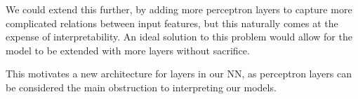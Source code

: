 We could extend this further, by adding more perceptron layers to capture more complicated relations between input features, but this naturally comes at the expense of interpretability. An ideal solution to this problem would allow for the model to be extended with more layers without sacrifice.

This motivates a new architecture for layers in our NN, as perceptron layers can be considered the main obstruction to interpreting our models.
